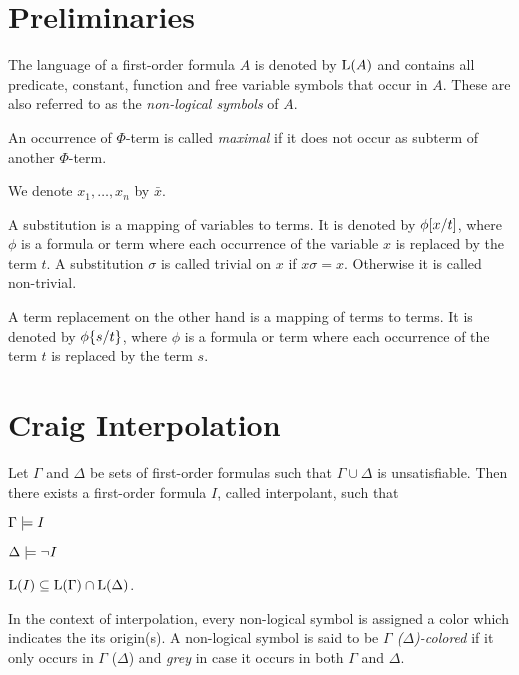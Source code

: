 \section{Preliminaries}

The language of a first-order formula $A$ is denoted by $\operatorname{L}(A)$ and contains all predicate, constant, function and free variable symbols that occur in $A$.
These are also referred to as the \emph{non-logical symbols} of $A$.

An occurrence of $\Phi$-term is called \emph{maximal} if it does not occur as subterm of another $\Phi$-term.

We denote $x_1, \ldots, x_n$ by $\bar x$.

A substitution is a mapping of variables to terms. It is denoted by $\phi[x/t]$, where $\phi$ is a formula or term where each occurrence of the variable $x$ is replaced by the term $t$.
A substitution $\sigma$ is called trivial on $x$ if $x\sigma = x$. Otherwise it is called non-trivial.

A term replacement on the other hand is a mapping of terms to terms. It is denoted by $\phi\{s/t\}$, where $\phi$ is a formula or term where each occurrence of the term $t$ is replaced by the term $s$.

\section{Craig Interpolation}


\begin{samepage}
	\begin{thm}[Interpolation]
		\label{thm:interpolation}
		Let $\Gamma$ and $\Delta$ be sets of first-order formulas such that $ \Gamma \cup \Delta $ is unsatisfiable.
		Then there exists a first-order formula $I$, called interpolant, such that \nopagebreak[4]
		\begin{compactenum}
		\item $ \Gamma \models I$ \label{int_1}
		\item $ \Delta \models \lnot I$  \label{int_2}
		\item $ \operatorname{L}(I) \subseteq \operatorname{L}(\Gamma) \cap \operatorname{L}(\Delta)$.  \label{int_3}
			\thmqed
		\end{compactenum}
	\end{thm}
\end{samepage}

In the context of interpolation, every non-logical symbol is assigned a color which indicates the its origin(s). 
A non-logical symbol is said to be \emph{$\Gamma$ ($\Delta$)-colored} if it only occurs in $\Gamma$ ($\Delta$) and \emph{grey} in case it occurs in both $\Gamma$ and $\Delta$.
